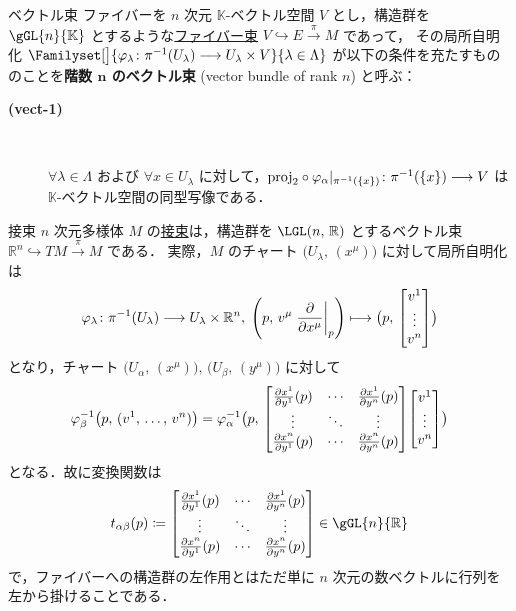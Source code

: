 \documentclass[TQFT_main]{subfiles}
\begin{document}
\begin{mydef}[label=def:vect]{ベクトル束}
    ファイバーを $n$ 次元 $\mathbb{K}$-ベクトル空間 $V$ とし，構造群を $\gGL{n}{\mathbb{K}}$ とするような\hyperref[def.fiber-1]{ファイバー束} $V \hookrightarrow E \xrightarrow{\pi} M$ であって，
    その局所自明化 $\Familyset[\big]{\varphi_\lambda \colon \pi^{-1}(U_\lambda) \lto U_\lambda \times V}{\lambda \in \Lambda}$ が以下の条件を充たすもののことを\textbf{階数 $\bm{n}$ のベクトル束} (vector bundle of rank $n$) と呼ぶ：
    \begin{description}
        \item[\textbf{(vect-1)}]　
        
        $\forall \lambda \in \Lambda$ および $\forall x \in U_\lambda$ に対して，$\mathrm{proj}_2 \circ \varphi_\alpha|_{\pi^{-1}(\{x\})} \colon \pi^{-1}(\{x\}) \longrightarrow V$ は $\mathbb{K}$-ベクトル空間の同型写像である．
    \end{description}
    
\end{mydef}

\begin{myexample}[label=ex:tangentbundle]{接束}
    $n$ 次元\cinfty 多様体 $M$ の\hyperref[def:tangentbundle]{接束}は，構造群を $\LGL(n,\, \mathbb{R})$ とするベクトル束
    $\mathbb{R}^n \hookrightarrow TM \xrightarrow{\pi} M$ である．
    実際，$M$ のチャート $\bigl( U_\lambda,\, (x^\mu) \bigr)$ に対して局所自明化は
    \begin{align}
        \varphi_\lambda \colon \pi^{-1} (U_\lambda) \lto U_\lambda \times \mathbb{R}^n,\; \left(p,\, v^\mu \eval{\pdv{}{x^\mu}}_p \right) \lmto \bigl(p,\, \mqty[v^1 \\ \vdots \\ v^n] \bigr)
    \end{align}
    となり，チャート $\bigl( U_\alpha,\, (x^\mu) \bigr),\, \bigl( U_\beta,\, (y^\mu) \bigr)$ に対して
    \begin{align}
        \varphi_\beta^{-1} \bigl( p,\, (v^1,\, \dots,\, v^n) \bigr) = \varphi_\alpha^{-1} \bigl( p,\, \mqty[\pdv{x^1}{y^1}()(p) &\cdots &\pdv{x^1}{y^n}()(p) \\ \vdots &\ddots &\vdots \\ \pdv{x^n}{y^1}()(p) &\cdots &\pdv{x^n}{y^n}()(p)]\mqty[v^1 \\ \vdots \\ v^n] \bigr) 
    \end{align}
    となる．故に変換関数は
    \begin{align}
        t_{\alpha\beta} (p) \coloneqq \mqty[\pdv{x^1}{y^1}()(p) &\cdots &\pdv{x^1}{y^n}()(p) \\ \vdots &\ddots &\vdots \\ \pdv{x^n}{y^1}()(p) &\cdots &\pdv{x^n}{y^n}()(p)] \in \gGL{n}{\mathbb{R}}
    \end{align}
    で，ファイバーへの構造群の左作用とはただ単に $n$ 次元の数ベクトルに行列を左から掛けることである．
\end{myexample}
\end{document}
